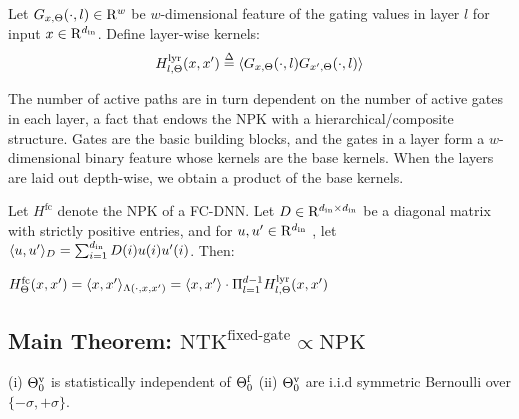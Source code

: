 %
\begin{definition}\label{def:layerkernel} Let $G_{x,\Theta}(\cdot,l)\in\mathrm{R}^w$ be $w$-dimensional feature of the gating values in layer $l$ for input $x\in\mathrm{R}^{d_{\text{in}}}$.  Define layer-wise kernels:
\begin{align*}
H^{\text{lyr}}_{l,\Theta}(x,x')\stackrel{\Delta}{=}\langle G_{x,\Theta}(\cdot,l)G_{x',\Theta}(\cdot,l)\rangle
\end{align*}
\end{definition}
The number of active paths are in turn dependent on the number of active gates in each layer, a fact that endows the NPK with a hierarchical/composite structure. Gates are the basic building blocks, and the gates in a layer form a $w$-dimensional binary feature whose kernels are the base kernels. When the layers are laid out depth-wise, we obtain a product of the base kernels. 
\begin{lemma}\label{lm:productkernel}
 Let $H^{\text{fc}}$ denote the NPK of a FC-DNN. Let $D\in\mathrm{R}^{d_{\text{in}}\times d_{\text{in}}}$ be a diagonal matrix with strictly positive entries, and for $u,u'\in\mathrm{R}^{d_{\text{in}}}$ , let $\langle u,u'\rangle_{D}=\sum_{i=1}^{d_{\text{in}}}D(i)u(i)u'(i)$. Then:

$
H^{\text{fc}}_{\Theta}(x,x')= \langle x,x'\rangle_{\Lambda(\cdot,x,x')}=\langle x,x'\rangle\cdot\Pi_{l=1}^{d-1}H^{\text{lyr}}_{l,\Theta}(x,x')
$

\end{lemma}
\subsection{Main Theorem: $\text{NTK}^{\text{fixed-gate}}\propto\text{NPK}$}
\begin{assumption}\label{assmp:main}
(i) ${\Theta}^{\text{v}}_0$ is statistically independent of $\Theta^{\textrm{f}}_0$ (ii) ${\Theta}^{\text{v}}_0$ are i.i.d symmetric Bernoulli over $\{-{\sigma},+{\sigma}\}$. 
\end{assumption}

